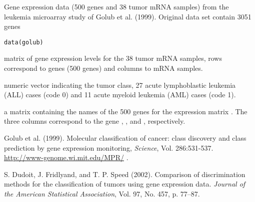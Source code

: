 \begin{Description}\relax
Gene expression data (500 genes and 38 tumor mRNA samples) 
from the leukemia microarray study of Golub et al. 
(1999). Original data set contain 3051 genes
\end{Description}
\begin{Usage}
\begin{verbatim}
data(golub)
\end{verbatim}
\end{Usage}
\begin{Value}
\begin{ldescription}
\item[\code{golub}] matrix of gene expression levels for the 
38 tumor mRNA samples, rows correspond to genes 
(500 genes) and columns to mRNA samples.
\item[\code{golub.cl}] numeric vector indicating the tumor 
class, 27 acute lymphoblastic leukemia (ALL) cases 
(code 0) and 11 acute myeloid leukemia (AML) cases (code 1). 
\item[\code{golub.gnames}] a matrix containing the names of 
the 500 genes for the expression matrix . 
The three columns correspond to the gene , 
, and , respectively.
\end{ldescription}
\end{Value}
\begin{Source}\relax
Golub et al. (1999). Molecular classification of cancer: class
discovery and class prediction by gene expression
monitoring, \emph{Science}, Vol. 286:531-537.\\
\url{http://www-genome.wi.mit.edu/MPR/}
.
\end{Source}
\begin{References}\relax
S. Dudoit, J. Fridlyand, and T. P. Speed (2002). 
Comparison of discrimination methods for the  classification 
of tumors using gene expression data. 
\emph{Journal of the American Statistical Association}, Vol. 97, No. 457, p. 77--87.
\end{References}

